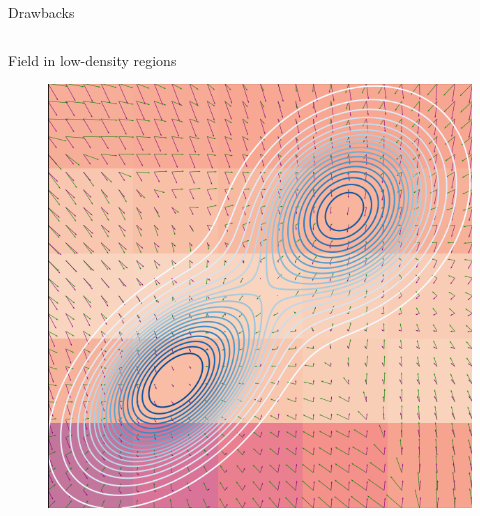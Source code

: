 \documentclass[handout, aspectratio=169,xcolor=dvipsnames]{beamer}
\begin{document}
\begin{frame}{Drawbacks}
  \pause 

  \begin{columns}
    \begin{column}{0.4\textwidth}
      \centering
        Field in low-density regions
      \begin{figure}
        \centering
        \includegraphics[height=0.32\textheight]{figs/gen/score_field_training_0.png}
      \end{figure}


\end{column}
\end{columns}
\end{frame}
\end{document}
